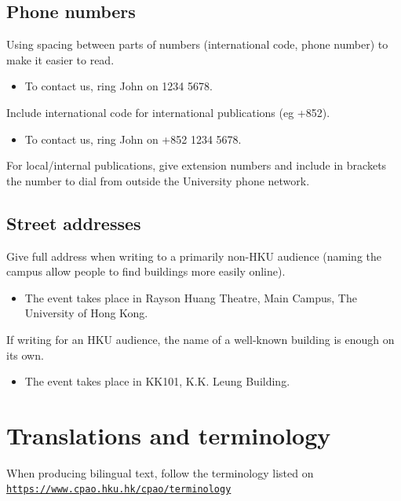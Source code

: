 \documentclass[11pt,a4paper]{book}
\newcommand{\cmark}{{\color{green(html/cssgreen)}\checkmark}}%
\begin{document}
					\subsection{Phone numbers}
					Using spacing between parts of numbers (international code, phone number) to make it easier to read.
					{\firasans \begin{mdframed}[backgroundcolor=aliceblue] \begin{itemize}[label=\cmark]
						\item To contact us, ring John on 1234 5678.
					\end{itemize} \end{mdframed} }
					Include international code for international publications (eg +852).
					{\firasans \begin{mdframed}[backgroundcolor=aliceblue] \begin{itemize}[label=\cmark]
						\item To contact us, ring John on +852 1234 5678.
					\end{itemize} \end{mdframed} }
					For local/internal publications, give extension numbers and include in brackets the number to dial from outside the University phone network.
					\subsection{Street addresses}
					Give full address when writing to a primarily non-HKU audience (naming the campus allow people to find buildings more easily online).
					{\firasans \begin{mdframed}[backgroundcolor=aliceblue] \begin{itemize}[label=\cmark]
						\item The event takes place in Rayson Huang Theatre, Main Campus, The University of Hong Kong.
					\end{itemize} \end{mdframed} }
				\newpage
					If writing for an HKU audience, the name of a well-known building is enough on its own.
					{\firasans \begin{mdframed}[backgroundcolor=aliceblue] \begin{itemize}[label=\cmark]
						\item The event takes place in KK101, K.K. Leung Building.
					\end{itemize} \end{mdframed} }
					\section{Translations and terminology}
					When producing bilingual text, follow the terminology listed on \texttt{\url{https://www.cpao.hku.hk/cpao/terminology}}
				
\end{document}

